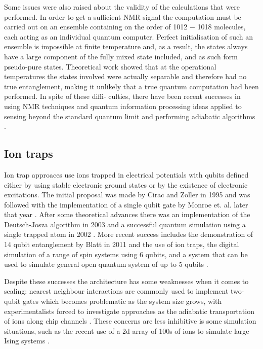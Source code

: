 Some issues were also raised about the validity of the calculations that were performed. In order to get a sufficient NMR signal the computation must be carried out on an ensemble containing on the order of 1012 − 1018 molecules, each acting as an individual quantum computer. Perfect initialisation of such an ensemble is impossible at finite temperature and, as a result, the states always have a large component of the fully mixed state included, and as such form pseudo-pure states. Theoretical work \cite{nmr_pseudo_pure} showed that at the operational temperatures the states involved were actually separable and therefore had no true entanglement, making it unlikely that a true quantum computation had been performed. In spite of these diffi- culties, there have been recent successes in using NMR techniques and quantum information processing ideas applied to sensing beyond the standard quantum limit \cite{nmr_sensing_09} and performing adiabatic algorithms \cite{nmr_143_factorization}.

\subsection{Ion traps}

Ion trap approaces use ions trapped in electrical potentials with qubits defined either by using stable electronic ground states or by the existence of electronic excitations. The initial proposal was made by Cirac and Zoller in 1995 \cite{cirac_zoller_ion_trap_proposal_95} and was followed with the implementation of a single qubit gate by Monroe et. al. later that year \cite{monroe_ion_trap_gate_95}. After some theoretical advances  \cite{first_ion_trap_wineland_98} there was an implementation of the Deutsch-Josza algorithm \cite{ion_trap_deutsch_jozsa_03} in 2003 and a successful quantum simulation using a single trapped atom in 2002 \cite{ion_trap_simulator_02}. More recent success includes the demonstration of 14 qubit entanglement by Blatt in 2011 \cite{ion_trap_14_qubits} and the use of ion traps, the digital simulation of a range of spin systems \cite{ion_trap_digital_simulator} using 6 qubits, and a system that can be used to simulate general open quantum system of up to 5 qubits \cite{ion_trap_simulator}.

Despite these successes the architecture has some weaknesses when it comes to scaling: nearest neighbour interactions are commonly used to implement two-qubit gates which becomes problematic as the system size grows, with experimentalists forced to investigate approaches as the adiabatic transportation of ions along chip channels \cite{ion_trap_on_chip}. These concerns are less inhibitive is some simulation situations, such as the recent use of a 2d array of 100s of ions to simulate large Ising systems \cite{ion_trap_magnetism_simulator}.

